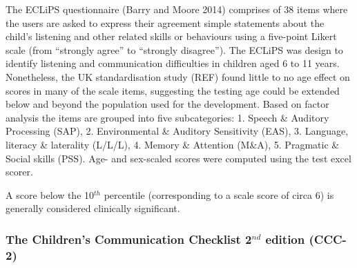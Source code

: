 \documentclass[a4paper,nobind]{templates/ociamthesis}
\begin{document}
The ECLiPS questionnaire (Barry and Moore 2014) comprises of 38 items where the users are asked to express their agreement simple statements about the child's listening and other related skills or behaviours using a five-point Likert scale (from ``strongly agree'' to ``strongly disagree''). The ECLiPS was design to identify listening and communication difficulties in children aged 6 to 11 years. Nonetheless, the UK standardisation study (REF) found little to no age effect on scores in many of the scale items, suggesting the testing age could be extended below and beyond the population used for the development. Based on factor analysis the items are grouped into five subcategories: 1. Speech \& Auditory Processing (SAP), 2. Environmental \& Auditory Sensitivity (EAS), 3. Language, literacy \& laterality (L/L/L), 4. Memory \& Attention (M\&A), 5. Pragmatic \& Social skills (PSS). Age- and sex-scaled scores were computed using the test excel scorer.

A score below the 10\(^{th}\) percentile (corresponding to a scale score of circa 6) is generally considered clinically significant.

\hypertarget{the-childrens-communication-checklist-2nd-edition-ccc-2}{%
\subsubsection*{\texorpdfstring{The Children's Communication Checklist 2\(^{nd}\) edition (CCC-2)}{The Children's Communication Checklist 2\^{}\{nd\} edition (CCC-2)}}\label{the-childrens-communication-checklist-2nd-edition-ccc-2}}
\end{document}

